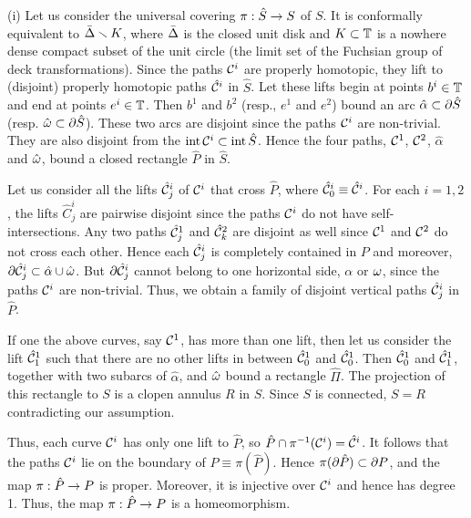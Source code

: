 \begin{pf} 
(i) %
 Let us consider the universal covering $\pi: \hat S\rightarrow S$ of $S$.
It is conformally equivalent to $\Bar {\Delta}\smallsetminus K$, where $\bar {\Delta}$ is the closed unit disk and $K\subset {\Bbb T}$
is a nowhere dense compact subset of the unit circle (the limit set of the Fuchsian group of deck transformations).
Since the paths ${\cal C}^i$ are properly homotopic, they lift to
(disjoint)  properly homotopic  paths $\hat {{\cal C}}^i$ in $\hat S$.
Let these lifts begin at points $b^i\in {\Bbb T}$ and end at points $e^i\in {\Bbb T}$.
Then $b^1$ and $b^2$ (resp., $e^1$ and $e^2$) bound an arc $\hat\alpha \subset \partial \hat S$ 
(resp. $\hat{{\omega}} \subset \partial \hat S$).
These two arcs are disjoint since the paths ${\cal C}^i$ are non-trivial. 
They are also disjoint from the $\operatorname{int}{\cal C}^i\subset \operatorname{int} \hat S$. 
Hence the four  paths, ${\cal C}^1$, ${\cal C}^2$, $\hat\alpha$ and $\hat{{\omega}}$, bound  a closed rectangle $\hat P$ in $\hat S$.

Let us consider all the lifts $\hat{{\cal C}}_j^i$ of ${\cal C}^i$ that cross $\hat P$, where $\hat {{\cal C}}^i_0\equiv \hat{{\cal C}}^i$.
For each  $i=1,2$, the lifts $\hat C_j^i$ are pairwise disjoint 
since the paths ${\cal C}^i$ do not have self-intersections.
Any two  paths $\hat {{\cal C}}^1_j$ and $\hat {{\cal C}}^2_k$ are disjoint as well
since ${\cal C}^1$ and ${\cal C}^2$ do not cross each other.
Hence each $\hat {{\cal C}}^i_j$ is completely contained in $P$ and moreover, 
$\partial \hat{{\cal C}}^i_j\subset \hat\alpha\cup \hat{{\omega}}$. But $\partial\hat{{\cal C}}^i_j$
cannot belong to one horizontal side, $\alpha$ or ${\omega}$,
since the paths ${\cal C}^i$ are non-trivial.
Thus, we obtain a  family of disjoint vertical paths $\hat{{\cal C}}^i_j$ in $\hat P$. 

If one the above curves, say ${\cal C}^1$, has  more than one lift, then let us consider the lift
$\hat{{\cal C}}^1_1$ such that there are no other lifts in between $\hat{{\cal C}}^1_0$ and $\hat {{\cal C}}^1_0$. 
Then $\hat{{\cal C}}^1_0$ and $\hat{{\cal C}}^1_1$, together with two subarcs of $\hat\alpha$, 
and $\hat{{\omega}}$ bound a rectangle $\hat \Pi$. The projection  of this rectangle to $S$
is a clopen annulus $R$ in $S$. Since $S$ is connected, $S=R$ contradicting our assumption.   

\ssk Thus, each  curve ${\cal C}^i$ has only one lift to $\hat P$, so $\hat P\cap \pi^{-1}({\cal C}^i)=\hat {{\cal C}}^i$. 
It follows that the paths ${\cal C}^i$ lie on the boundary of $P \equiv  \pi(\hat P)$. 
Hence $\pi(\partial\hat P) \subset \partial P$,  
and the map $\pi: \hat P\rightarrow P$ is proper.
Moreover, it is injective over  ${\cal C}^i$ and hence has degree 1. 
Thus,  the map $\pi: \hat P\rightarrow P$ is a homeomorphism.


\end{pf}
